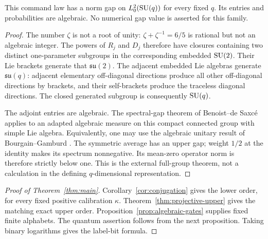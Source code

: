 \begin{proposition}\label{prop:algebraic-gates}
This command law has a norm gap on $L^2_0(\operatorname{SU}(q))$ for every fixed $q$.
Its entries and probabilities are algebraic. No numerical gap value is
asserted for this family.
\end{proposition}
\begin{proof}
The number $\zeta$ is not a root of unity: $\zeta+\zeta^{-1}=6/5$
is rational but not an algebraic integer. The powers of $R_j$ and $D_j$
therefore have closures containing two distinct one-parameter subgroups
in the corresponding embedded $\operatorname{SU}(2)$. Their Lie brackets generate
that $\mathfrak{su}(2)$. The adjacent embedded Lie algebras generate
$\mathfrak{su}(q)$: adjacent elementary off-diagonal directions produce
all other off-diagonal directions by brackets, and their self-brackets
produce the traceless diagonal directions. The closed generated subgroup
is consequently $\operatorname{SU}(q)$.

The adjoint entries are algebraic. The spectral-gap theorem of
Benoist--de Saxc\'e \cite[Theorem 1.2]{BdS} applies to an adapted
algebraic measure on this compact connected group with simple Lie
algebra. Equivalently, one may use the algebraic unitary result of
Bourgain--Gamburd \cite{BG12}. The symmetric average has an upper gap;
weight $1/2$ at the identity makes its spectrum nonnegative. Its
mean-zero operator norm is therefore strictly below one. This is the
external full-group theorem, not a calculation in the defining
$q$-dimensional representation.
\end{proof}

\begin{proof}[Proof of Theorem~\ref{thm:main}]
Corollary~\ref{cor:conjugation} gives the lower order, for every fixed
positive calibration $\kappa$. Theorem~\ref{thm:projective-upper} gives
the matching exact upper order. Proposition~\ref{prop:algebraic-gates}
supplies fixed finite alphabets. The quantum assertion follows from the
next proposition. Taking binary logarithms gives the label-bit formula.
\end{proof}

